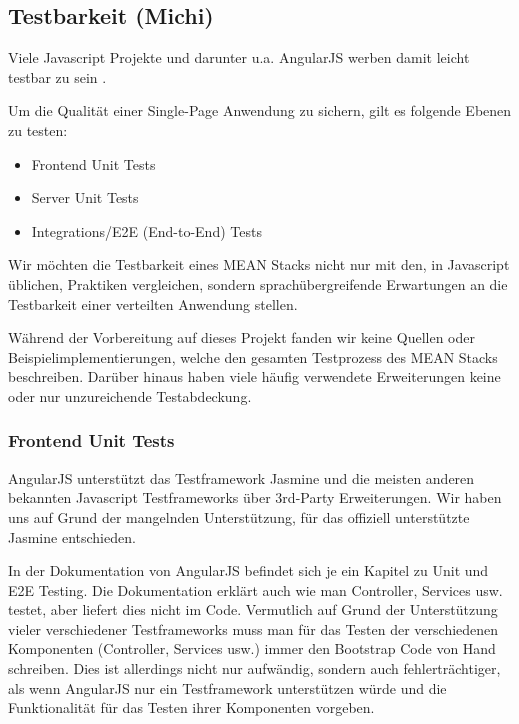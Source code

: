 \subsection{Testbarkeit (Michi)}\label{testbarkeit-michi}

Viele Javascript Projekte und darunter u.a. AngularJS werben damit
leicht testbar zu sein \cite{angular-testing}.

Um die Qualität einer Single-Page Anwendung zu sichern, gilt es folgende
Ebenen zu testen:

\begin{itemize}
\item
  Frontend Unit Tests
\item
  Server Unit Tests
\item
  Integrations/E2E (End-to-End) Tests
\end{itemize}

Wir möchten die Testbarkeit eines MEAN Stacks nicht nur mit den, in
Javascript üblichen, Praktiken vergleichen, sondern sprachübergreifende
Erwartungen an die Testbarkeit einer verteilten Anwendung stellen.

Während der Vorbereitung auf dieses Projekt fanden wir keine Quellen
oder Beispielimplementierungen, welche den gesamten Testprozess des MEAN
Stacks beschreiben. Darüber hinaus haben viele häufig verwendete
Erweiterungen keine oder nur unzureichende Testabdeckung.

\subsubsection{Frontend Unit Tests}\label{frontend-unit-tests}

AngularJS unterstützt das Testframework Jasmine\cite{jasmine} und die meisten anderen
bekannten Javascript Testframeworks über 3rd-Party Erweiterungen. Wir
haben uns auf Grund der mangelnden Unterstützung, für das offiziell
unterstützte Jasmine entschieden.

In der Dokumentation von AngularJS befindet sich je ein Kapitel zu Unit und
E2E Testing. Die Dokumentation erklärt auch wie man Controller, Services usw.
testet, aber liefert dies nicht im Code. Vermutlich auf Grund der Unterstützung vieler verschiedener
Testframeworks muss man für das Testen der verschiedenen Komponenten
(Controller, Services usw.) immer den Bootstrap Code von Hand schreiben.
Dies ist allerdings nicht nur aufwändig, sondern auch fehlerträchtiger, als wenn
AngularJS nur ein Testframework unterstützen würde und die
Funktionalität für das Testen ihrer Komponenten vorgeben.

